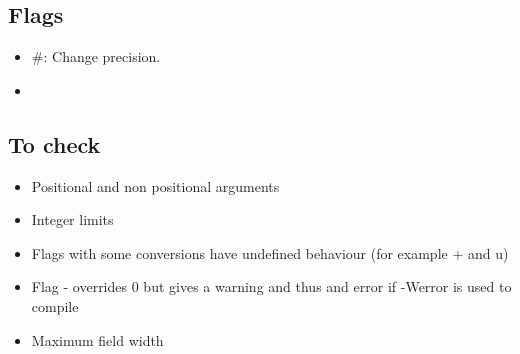 \documentclass[12pt]{article}
\begin{document}
\subsection{Flags}
\begin{itemize}
\item $\#$: Change precision.
\item 
\end{itemize}

\subsection{To check}
\begin{itemize}
\item Positional and non positional arguments
\item Integer limits
\item Flags with some conversions have undefined behaviour (for example + and u)
\item Flag - overrides 0 but gives a warning and thus and error if -Werror  is used to compile
\item Maximum field width
\end{itemize}
\end{document}
